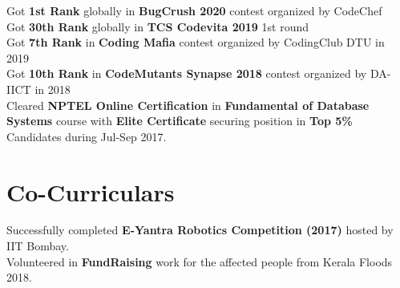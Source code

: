 \documentclass[]{jaydeep-resume-openfont}
\begin{document}
\begin{minipage}[t]{0.29\textwidth}
\textbullet{} Got \textbf{1st Rank} globally in \textbf{BugCrush 2020} contest organized by CodeChef\\
\textbullet{} Got \textbf{30th Rank} globally in \textbf{TCS Codevita 2019} 1st round\\
\textbullet{} Got \textbf{7th Rank} in \textbf{Coding Mafia} contest organized by CodingClub DTU in 2019\\
\textbullet{} Got \textbf{10th Rank} in \textbf{CodeMutants Synapse 2018} contest organized by DA-IICT in 2018\\
\textbullet{} Cleared \textbf{NPTEL Online Certification} in \textbf{Fundamental of Database Systems} course with \textbf{Elite Certificate} securing position in \textbf{Top 5\%} Candidates during Jul-Sep 2017.\\
\sectionsep


\section{Co-Curriculars}

\textbullet{} Successfully completed \textbf{E-Yantra Robotics Competition (2017)} hosted by IIT Bombay.\\
\textbullet{} Volunteered in \textbf{FundRaising} work for the affected people from Kerala Floods 2018.
\sectionsep

%
%

\end{minipage}
\hfill
\end{document}
